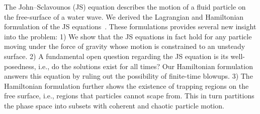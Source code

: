 \documentclass{article}
\begin{document}
\begin{enumerate}
The John--Sclavounos (JS) equation describes the  motion of a fluid particle on the free-surface of a water wave.
We derived the Lagrangian and Hamiltonian formulation of the JS equations~\cite{FF15,FarazmandJFM2015}. These formulations provides several new insight
into the problem: 1) We show that the JS equations in fact hold for any particle moving under the force of gravity whose motion
is constrained to an unsteady surface. 2) A fundamental open question regarding the JS equation is its well-posedness, i.e., do 
the solutions exist for all times? Our Hamiltonian formulation answers this equation by ruling out the possibility of finite-time blowups.
3) The Hamiltonian formulation further shows the existence of trapping regions on the free surface, i.e., regions that particles cannot scape from.
This in turn partitions the phase space into subsets with coherent and chaotic particle motion.


\end{enumerate}



\end{document}
